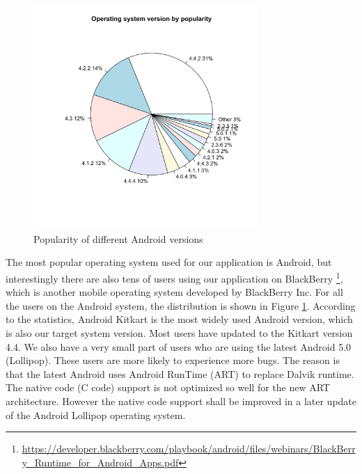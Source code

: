 \begin{figure}[!t]
\centering \includegraphics[height=8.5cm]{charts/os_version_popularity}
\caption{Popularity of different Android versions \label{os_versions}}
\end{figure}
The most popular operating system used for our application is Android, but
interestingly there are also tens of users using our application on
BlackBerry
\footnote{\url{https://developer.blackberry.com/playbook/android/files/webinars/BlackBerry_Runtime_for_Android_Apps.pdf}},
which is another mobile operating system developed by BlackBerry Inc.  For all
the users on the Android system, the distribution is shown in Figure
\ref{os_versions}. According to the statistics, Android Kitkart is the most
widely used Android version, which is also our target system version. Most
users have updated to the Kitkart version 4.4. We also have a very small part
of users who are using the latest Android 5.0 (Lollipop). These users are more
likely to experience more bugs. The reason is that the latest Android uses
Android RunTime (ART) to replace Dalvik runtime\cite{dalvik_arch}. The native
code (C code) support is not optimized so well for the new ART architecture.
However the native code support shall be improved in a later update of
the Android Lollipop operating system.

